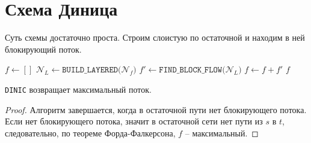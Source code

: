 \section{Схема Диница}

Суть схемы достаточно проста. Строим слоистую по остаточной и находим в ней блокирующий поток.

\begin{algorithm}[H]
\caption{Схема Диница}
\begin{algorithmic}[1]

    \State $f \gets []$
        \State $\mathcal{N}_L \gets \texttt{BUILD\_LAYERED(}\mathcal{N}_f\texttt{)}$
        \State $f' \gets \texttt{FIND\_BLOCK\_FLOW(}\mathcal{N}_L\texttt{)}$
        \State $f \gets f + f'$
    \EndWhile
    \State \Return $f$
\EndFunction
\end{algorithmic}
\end{algorithm}

\St \texttt{DINIC} возвращает максимальный поток.
\begin{proof}

    Алгоритм завершается, когда в остаточной пути нет блокирующего потока. Если нет блокирующего потока, значит в остаточной сети нет пути из $s$ в $t$, следовательно, по теореме Форда-Фалкерсона, $f$ -- максимальный.

\end{proof}

